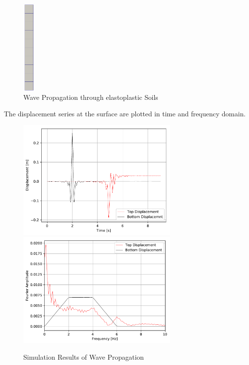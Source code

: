 \begin{figure}[H]
  \centering
  \includegraphics[width = 0.6cm]{./Figure-files/Day3/Wave_Propagation_through_elastoplastic_Soil/overview.png}
  \caption{Wave Propagation through elastoplastic Soils}
  \label{fig_wave_propagation_elastoplastic}
\end{figure}


The displacement series at the surface are plotted in time and frequency domain.


\begin{figure}[H]
  \centering
  \includegraphics[width = 8cm]{./Figure-files/Day3/Wave_Propagation_through_elastoplastic_Soil/Displacement.pdf}
  \includegraphics[width = 8cm]{./Figure-files/Day3/Wave_Propagation_through_elastoplastic_Soil/Displacement_Spectrum.pdf}
  \caption{Simulation Results of Wave Propagation}
  \label{fig_elastic_plastic_wave_propagation}
\end{figure}






